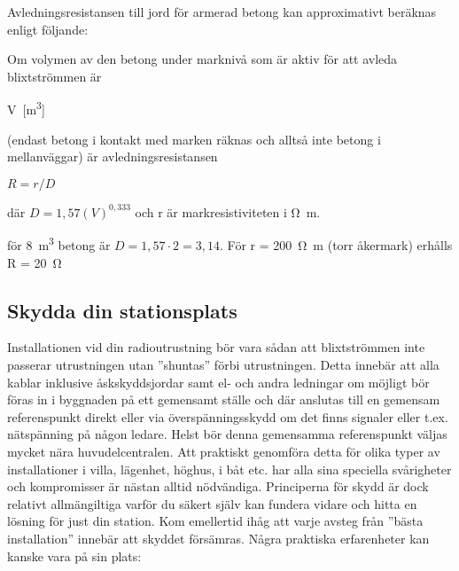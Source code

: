 Avledningsresistansen till jord för armerad betong kan approximativt beräknas
enligt följande:

\begin{exempelbox}
Om volymen av den betong under marknivå som är aktiv för att avleda
blixtströmmen är

V~[\unit{\cubic\metre}]

(endast betong i kontakt med marken räknas och alltså inte betong i
mellanväggar) är avledningsresistansen

\(R = r/D\)

där \(D = 1,57 (V)^{0,333}\) och r är markresistiviteten i \unit{\ohm\metre}.

för \qty{8}{\cubic\metre} betong är \(D = 1,57 \cdot 2 = 3,14\).
För r = \qty{200}{\ohm\metre} (torr åkermark) erhålls R = \qty{20}{\ohm}
\end{exempelbox}

\subsection{Skydda din stationsplats}
Installationen vid din radioutrustning bör vara sådan att blixtströmmen inte
passerar utrustningen utan ''shuntas'' förbi utrustningen.
Detta innebär att alla kablar inklusive åskskyddsjordar samt el- och andra
ledningar om möjligt bör föras in i byggnaden på ett gemensamt ställe och där
anslutas till en gemensam referenspunkt direkt eller via överspänningsskydd om
det finns signaler eller t.ex. nätspänning på någon ledare.
Helst bör denna gemensamma referenspunkt väljas mycket nära huvudelcentralen.
Att praktiskt genomföra detta för olika typer av installationer i villa,
lägenhet, höghus, i båt etc. har alla sina speciella svårigheter och
kompromisser är nästan alltid nödvändiga.
Principerna för skydd är dock relativt allmängiltiga varför du säkert själv kan
fundera vidare och hitta en lösning för just din station.
Kom emellertid ihåg att varje avsteg från ''bästa installation'' innebär att
skyddet försämras.
Några praktiska erfarenheter kan kanske vara på sin plats:


